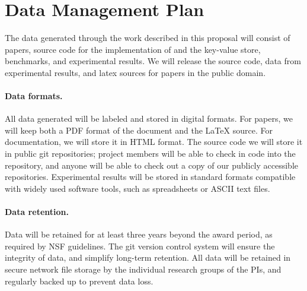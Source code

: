\newpage
\section*{Data Management Plan}

% 
% 
% 
% 
% 

The data generated through the work described in this proposal will consist of
papers, source code for the implementation of \sys and the key-value store,
benchmarks, and experimental results.  We will release the source code, data
from experimental results, and latex sources for papers in the public domain.

\paragraph{Data formats.}
All data generated will be labeled and stored in digital formats.  For papers,
we will keep both a PDF format of the document and the {\LaTeX} source.  For
documentation, we will store it in HTML format.  The source code we will store
it in public git repositories; project members will be able to check in code
into the repository, and anyone will be able to check out a copy of our
publicly accessible repositories.  Experimental results will be stored in
standard formats compatible with widely used software tools, such as
spreadsheets or ASCII text files.

\paragraph{Data retention.}
Data will be retained for at least three years beyond the award period, as
required by NSF guidelines.  The git version control system will ensure the
integrity of data, and simplify long-term retention.  All data will be retained
in secure network file storage by the individual research groups of the PIs, and
regularly backed up to prevent data loss.


